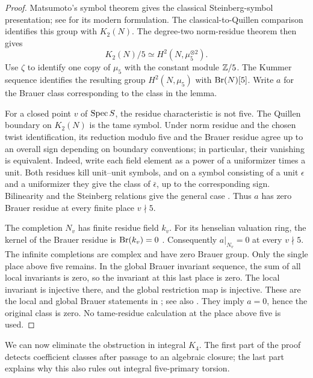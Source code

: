 \begin{proof}
Matsumoto's symbol theorem
\cite[\S5, Theorem~5.10 and Corollary~5.11]{Matsumoto1969} gives the
classical Steinberg-symbol presentation; see \cite[III.6.1]{Weibel2013}
for its modern formulation.  The classical-to-Quillen comparison
\cite[IV.1.10.1 and IV.7.2]{Weibel2013} identifies this group with
$K_2(N)$.  The degree-two norm-residue theorem
\cite[Theorem~6.16]{Voevodsky2011} then gives
\[
 K_2(N)/5\simeq H^2(N,\mu_5^{\otimes2}).
\]
Use $\zeta$ to identify one copy of $\mu_5$ with the constant module
$\mathbb Z/5$.  The Kummer sequence identifies the resulting group
$H^2(N,\mu_5)$ with $\operatorname{Br}(N)[5]$.  Write $a$ for the Brauer class
corresponding to the class in the lemma.

For a closed point $v$ of $\operatorname{Spec} S$, the residue characteristic is
not five.  The Quillen boundary on $K_2(N)$ is the tame symbol.  Under
norm residue and the chosen twist identification, its reduction modulo
five and the Brauer residue agree up to an overall sign depending on
boundary conventions; in particular, their vanishing is equivalent.
Indeed, write each field element as a power of a uniformizer times a
unit.  Both residues kill unit--unit symbols, and on a symbol consisting
of a unit $\epsilon$ and a uniformizer they give the class of
$\bar\epsilon$, up to the corresponding sign.  Bilinearity and the
Steinberg relations give the general case
\cite[V.6.1.2 and V.(6.6)]{Weibel2013}
\cite[Proposition~7.10]{Harari2023Brauer}.  Thus $a$ has zero Brauer
residue at every finite place $v\nmid5$.

The completion $N_v$ has finite residue field $k_v$.  For its henselian
valuation ring, the kernel of the Brauer residue is $\operatorname{Br}(k_v)=0$
\cite[Proposition~6.7 and Example~6.8(a)]{Harari2023Brauer}.
Consequently $a|_{N_v}=0$ at every $v\nmid5$.  The infinite completions
are complex and have zero Brauer group.  Only the single place above
five remains.  In the global Brauer invariant sequence, the sum of all
local invariants is zero, so the invariant at this last place is zero.
The local invariant is injective there, and the global restriction map
is injective.  These are the local and global Brauer statements in
\cite[IV, Example~2.14(c)--(e), Proposition~4.3 and Remark~4.4(a)]{MilneCFT2020}; see also
\cite[III.6 and VI.8.1.1]{Weibel2013}.  They imply $a=0$, hence the
original class is zero.  No tame-residue calculation at the place above
five is used.
\end{proof}

We can now eliminate the obstruction in integral $K_4$.  The first part
of the proof detects coefficient classes after passage to an algebraic
closure; the last part explains why this also rules out integral
five-primary torsion.

